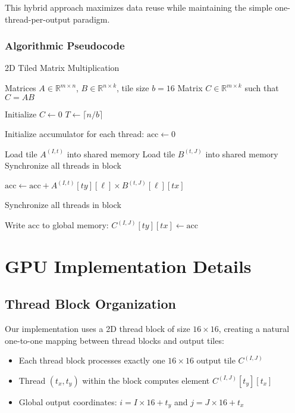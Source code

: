\documentclass{amsbook}
\theoremstyle{definition}
\begin{document}
This hybrid approach maximizes data reuse while maintaining the simple one-thread-per-output paradigm.

\subsubsection{Algorithmic Pseudocode}

\begin{algorithm}
\caption{2D Tiled Matrix Multiplication}
\begin{algorithmic}[1]
\Require Matrices $A \in \mathbb{R}^{m \times n}$, $B \in \mathbb{R}^{n \times k}$, tile size $b = 16$
\Ensure Matrix $C \in \mathbb{R}^{m \times k}$ such that $C = AB$

\State Initialize $C \leftarrow 0$
\State $T \leftarrow \lceil n/b \rceil$ 

    \State Initialize accumulator for each thread: $\text{acc} \leftarrow 0$

     
        \State Load tile $A^{(I,t)}$ into shared memory 
        \State Load tile $B^{(t,J)}$ into shared memory 
        \State Synchronize all threads in block

         
            \State $\text{acc} \leftarrow \text{acc} + A^{(I,t)}[ty][\ell] \times B^{(t,J)}[\ell][tx]$
        \EndFor

        \State Synchronize all threads in block
    \EndFor

    \State Write $\text{acc}$ to global memory: $C^{(I,J)}[ty][tx] \leftarrow \text{acc}$
\EndFor
\end{algorithmic}
\end{algorithm}

\section{GPU Implementation Details}

\subsection{Thread Block Organization}

Our implementation uses a 2D thread block of size $16 \times 16$, creating a natural one-to-one mapping between thread blocks and output tiles:
\begin{itemize}
\item Each thread block processes exactly one $16 \times 16$ output tile $C^{(I,J)}$
\item Thread $(t_x, t_y)$ within the block computes element $C^{(I,J)}[t_y][t_x]$
\item Global output coordinates: $i = I \times 16 + t_y$ and $j = J \times 16 + t_x$
\end{itemize}
\end{document}
